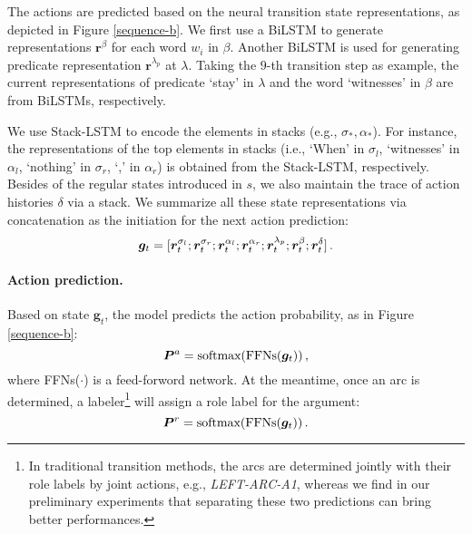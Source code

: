 \documentclass[letterpaper]{article} %
\begin{document}
\begin{CJK}{UTF8}{gbsn}
The actions are predicted based on the neural transition state representations, as depicted in Figure \ref{sequence-b}.
We first use a BiLSTM to generate  representations $\bm{r}^{\beta}$ for each word $w_i$ in $\beta$.
Another BiLSTM is used for generating predicate representation $\bm{r}^{\lambda_p}$ at $\lambda$.
Taking the $9$-th transition step as example, the current representations of predicate `stay' in $\lambda$ and the word `witnesses' in $\beta$ are from BiLSTMs, respectively.


We use Stack-LSTM \cite{ZhangQZLJ19,YuanJT19} to encode the elements in stacks (e.g., $\sigma_{*}, \alpha_{*}$).
For instance, the representations of the top elements in stacks (i.e., `When' in $\sigma_{l}$, `witnesses' in $\alpha_{l}$, `nothing' in $\sigma_{r}$, `,' in $\alpha_{r}$) is obtained from the Stack-LSTM, respectively.
Besides of the regular states introduced in $s$, we also maintain the trace of action histories $\delta$ via a stack.
We summarize all these state representations via concatenation as the initiation for the next action prediction: 
\begin{equation}
\setlength\abovedisplayskip{2pt}
\setlength\belowdisplayskip{2pt}
\bm{g}_t = [\bm{r}^{\sigma_l}_t;\bm{r}^{\sigma_r}_t;\bm{r}^{\alpha_l}_t;\bm{r}^{\alpha_r}_t;\bm{r}^{\lambda_p}_t;\bm{r}^{\beta}_t;\bm{r}^{\delta}_t] \,.
\end{equation}



\paragraph{Action prediction.}
Based on state $\bm{g}_t$, the model predicts the action probability, as in Figure \ref{sequence-b}:
\begin{equation} \label{label_score}
\setlength\abovedisplayskip{2pt}
\setlength\belowdisplayskip{2pt}
\bm{P}^{a} = \text{softmax}(\text{FFNs}(\bm{g}_t)) \,,
\end{equation}
where FFNs($\cdot$) is a feed-forword network.
At the meantime, once an arc is determined,
a labeler\footnote{
In traditional transition methods, the arcs are determined jointly with their role labels by joint actions, e.g., \emph{LEFT-ARC-A1}, whereas we find in our preliminary experiments that separating these two predictions can bring better performances.
}
will assign a role label for the argument:
\begin{equation} \label{role_score}
\setlength\abovedisplayskip{2pt}
\setlength\belowdisplayskip{2pt}
\bm{P}^{r} = \text{softmax}(\text{FFNs}(\bm{g}_t)) \,.
\end{equation}







\end{CJK}
\end{document}
